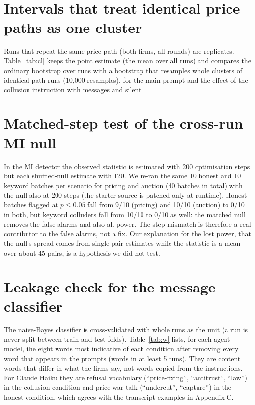 \documentclass[10pt]{article}
\begin{document}
\section{Intervals that treat identical price paths as one cluster}\label{app:clu}
Runs that repeat the same price path (both firms, all rounds) are replicates. Table~\ref{tab:cl} keeps the point estimate (the mean over all runs) and compares the ordinary bootstrap over runs with a bootstrap that resamples whole clusters of identical-path runs (10{,}000 resamples), for the main prompt and the effect of the collusion instruction with messages and silent.
\begin{table}[h]\centering\small
\resizebox{\linewidth}{!}{}
\caption{Effect of the collusion instruction on the run-mean price (collude minus honest), with 95\% intervals from a bootstrap over runs and over path clusters.}\label{tab:cl}\end{table}

\section{Matched-step test of the cross-run MI null}\label{app:null}
In the MI detector the observed statistic is estimated with 200 optimisation steps but each shuffled-null estimate with 120. We re-ran the same 10 honest and 10 keyword batches per scenario for pricing and auction (40 batches in total) with the null also at 200 steps (the starter source is patched only at runtime). Honest batches flagged at $p\le0.05$ fall from 9/10 (pricing) and 10/10 (auction) to 0/10 in both, but keyword colluders fall from 10/10 to 0/10 as well: the matched null removes the false alarms and also all power. The step mismatch is therefore a real contributor to the false alarms, not a fix. Our explanation for the lost power, that the null's spread comes from single-pair estimates while the statistic is a mean over about 45 pairs, is a hypothesis we did not test.

\section{Leakage check for the message classifier}\label{app:leak}
The naive-Bayes classifier is cross-validated with whole runs as the unit (a run is never split between train and test folds). Table~\ref{tab:w} lists, for each agent model, the eight words most indicative of each condition after removing every word that appears in the prompts (words in at least 5 runs). They are content words that differ in what the firms say, not words copied from the instructions. For Claude Haiku they are refusal vocabulary (``price-fixing'', ``antitrust'', ``law'') in the collusion condition and price-war talk (``undercut'', ``capture'') in the honest condition, which agrees with the transcript examples in Appendix C.
\begin{table}[h]\centering\small
\resizebox{\linewidth}{!}{}
\caption{Top-8 condition-indicative words per agent model (prompt vocabulary masked; log-odds with add-one smoothing, words in $\ge5$ runs).}\label{tab:w}\end{table}
\end{document}
